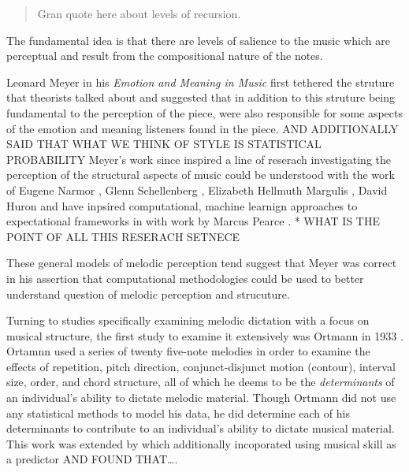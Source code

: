 \documentclass[]{book}
\theoremstyle{definition}
\theoremstyle{definition}
\theoremstyle{definition}
\theoremstyle{remark}
\begin{document}
\begin{quote}
Gran quote here about levels of recursion.
\end{quote}

The fundamental idea is that there are levels of salience to the music
which are perceptual and result from the compositional nature of the
notes.

Leonard Meyer in his \emph{Emotion and Meaning in Music}
\citep{meyerEmotionMeaningMusic1956}first tethered the struture that
theorists talked about and suggested that in addition to this struture
being fundamental to the perception of the piece, were also responsible
for some aspects of the emotion and meaning listeners found in the
piece. AND ADDITIONALLY SAID THAT WHAT WE THINK OF STYLE IS STATISTICAL
PROBABILITY Meyer's work since inspired a line of reserach investigating
the perception of the structural aspects of music could be understood
with the work of Eugene Narmor
\citep{narmourAnalysisCognitionBasic1990, narmourAnalysisCognitionMelodic1992},
Glenn Schellenberg
\citep{schellenbergSimplifyingImplicationRealizationModel1997},
Elizabeth Hellmuth Margulis \citep{margulisModelMelodicExpectation2005},
David Huron \citep{huronSweetAnticipation2006} and have inpsired
computational, machine learnign approaches to expectational frameworks
in with work by Marcus Pearce
\citep{pearceAuditoryExpectationInformation2012}. * WHAT IS THE POINT OF
ALL THIS RESERACH SETNECE

These general models of melodic perception tend suggest that Meyer was
correct in his assertion that computational methodologies could be used
to better understand question of melodic perception and strucuture.

Turning to studies specifically examining melodic dictation with a focus
on musical structure, the first study to examine it extensively was
Ortmann in 1933 \citep{ortmannTonalDeterminantsMelodic1933}. Ortamnn
used a series of twenty five-note melodies in order to examine the
effects of repetition, pitch direction, conjunct-disjunct motion
(contour), interval size, order, and chord structure, all of which he
deems to be the \emph{determinants} of an individual's ability to
dictate melodic material. Though Ortmann did not use any statistical
methods to model his data, he did determine each of his determinants to
contribute to an individual's ability to dictate musical material. This
work was extended by \citep{taylorStrategiesMemoryShort1983} which
additionally incoporated using musical skill as a predictor AND FOUND
THAT\ldots{}.
\end{document}
